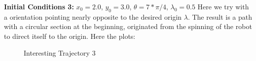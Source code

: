 \documentclass[10pt,a4paper]{article}
\begin{document}
\textbf{Initial Conditions 3:} $x_{0} = 2.0$, $y_{0} = 3.0$, $\theta = 7*\pi / 4 $, $\lambda_{0} = 0.5$
Here we try with a orientation pointing nearly opposite to the desired origin $\lambda$. The result is a path  with a circular section at the beginning, originated from the spinning of the robot to direct itself to the origin. Here the plots: 

	\begin{figure}[h]
			\centering
            \caption{ Interesting Trajectory 3 }
            \label{fig:Q2b3}
	\end{figure}
\end{document}
